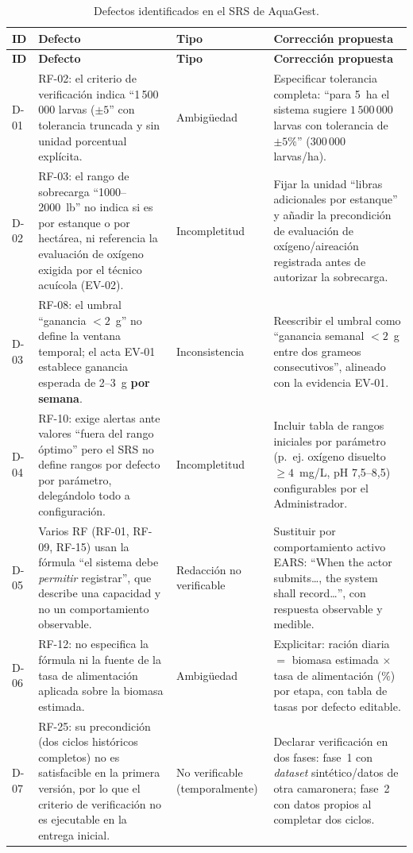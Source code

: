 \documentclass[11pt,a4paper]{article}
\renewcommand{\_}{\textunderscore\allowbreak}
\begin{document}
\begin{longtable}{|p{1.1cm}|p{5.1cm}|p{2.5cm}|p{5.3cm}|}
\caption{Defectos identificados en el SRS de AquaGest.}
\label{tab:defectos}\\
\hline
\textbf{ID} & \textbf{Defecto} & \textbf{Tipo} & \textbf{Corrección propuesta}\\
\hline
\endfirsthead

\hline
\textbf{ID} & \textbf{Defecto} & \textbf{Tipo} & \textbf{Corrección propuesta}\\
\hline
\endhead

\hline
\endfoot

\hline
\endlastfoot

D-01 & RF-02: el criterio de verificación indica ``1\,500\,000 larvas ($\pm5$'' con tolerancia truncada y sin unidad porcentual explícita. & Ambigüedad & Especificar tolerancia completa: ``para 5~ha el sistema sugiere $1\,500\,000$ larvas con tolerancia de $\pm5\%$'' (300\,000 larvas/ha).\\
\hline
D-02 & RF-03: el rango de sobrecarga ``1000--2000~lb'' no indica si es por estanque o por hectárea, ni referencia la evaluación de oxígeno exigida por el técnico acuícola (EV-02). & Incompletitud & Fijar la unidad ``libras adicionales por estanque'' y añadir la precondición de evaluación de oxígeno/aireación registrada antes de autorizar la sobrecarga.\\
\hline
D-03 & RF-08: el umbral ``ganancia $<2$~g'' no define la ventana temporal; el acta EV-01 establece ganancia esperada de 2--3~g \textbf{por semana}. & Inconsistencia & Reescribir el umbral como ``ganancia semanal $<2$~g entre dos grameos consecutivos'', alineado con la evidencia EV-01.\\
\hline
D-04 & RF-10: exige alertas ante valores ``fuera del rango óptimo'' pero el SRS no define rangos por defecto por parámetro, delegándolo todo a configuración. & Incompletitud & Incluir tabla de rangos iniciales por parámetro (p.~ej. oxígeno disuelto $\geq 4$~mg/L, pH 7,5--8,5) configurables por el Administrador.\\
\hline
D-05 & Varios RF (RF-01, RF-09, RF-15) usan la fórmula ``el sistema debe \textit{permitir} registrar'', que describe una capacidad y no un comportamiento observable. & Redacción no verificable & Sustituir por comportamiento activo EARS: ``When the actor submits\ldots, the system shall record\ldots'', con respuesta observable y medible.\\
\hline
D-06 & RF-12: no especifica la fórmula ni la fuente de la tasa de alimentación aplicada sobre la biomasa estimada. & Ambigüedad & Explicitar: ración diaria $=$ biomasa estimada $\times$ tasa de alimentación ($\%$) por etapa, con tabla de tasas por defecto editable.\\
\hline
D-07 & RF-25: su precondición (dos ciclos históricos completos) no es satisfacible en la primera versión, por lo que el criterio de verificación no es ejecutable en la entrega inicial. & No verificable (temporalmente) & Declarar verificación en dos fases: fase~1 con \textit{dataset} sintético/datos de otra camaronera; fase~2 con datos propios al completar dos ciclos.\\

\end{longtable}
\end{document}
